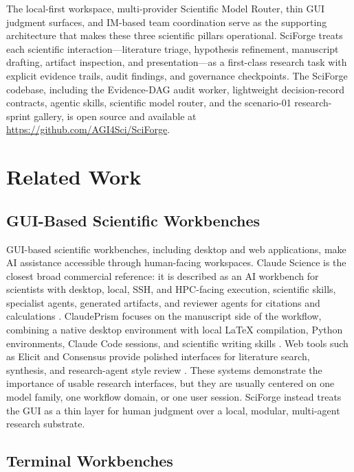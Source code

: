 \documentclass[sn-basic,Numbered,pdflatex]{sn-jnl}
\begin{document}
The local-first workspace, multi-provider Scientific Model Router, thin GUI judgment surfaces, and IM-based team coordination serve as the supporting architecture that makes these three scientific pillars operational. SciForge treats each scientific interaction---literature triage, hypothesis refinement, manuscript drafting, artifact inspection, and presentation---as a first-class research task with explicit evidence trails, audit findings, and governance checkpoints. The SciForge codebase, including the Evidence-DAG audit worker, lightweight decision-record contracts, agentic skills, scientific model router, and the scenario-01 research-sprint gallery, is open source and available at \url{https://github.com/AGI4Sci/SciForge}.

\section{Related Work}

\subsection{GUI-Based Scientific Workbenches}

GUI-based scientific workbenches, including desktop and web applications, make AI assistance accessible through human-facing workspaces. Claude Science is the closest broad commercial reference: it is described as an AI workbench for scientists with desktop, local, SSH, and HPC-facing execution, scientific skills, specialist agents, generated artifacts, and reviewer agents for citations and calculations \cite{anthropicClaudeScience2026}. ClaudePrism focuses on the manuscript side of the workflow, combining a native desktop environment with local LaTeX compilation, Python environments, Claude Code sessions, and scientific writing skills \cite{claudePrism2026}. Web tools such as Elicit and Consensus provide polished interfaces for literature search, synthesis, and research-agent style review \cite{elicit2026,consensus2026}. These systems demonstrate the importance of usable research interfaces, but they are usually centered on one model family, one workflow domain, or one user session. SciForge instead treats the GUI as a thin layer for human judgment over a local, modular, multi-agent research substrate.

\subsection{Terminal Workbenches}
\end{document}
